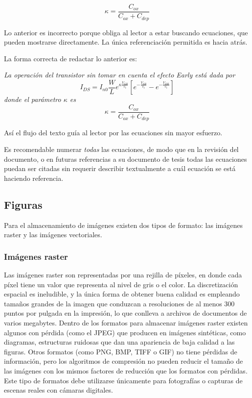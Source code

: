 \begin{equation} \label{eq:ej2}
  \kappa = \frac{C_{ox}}{C_{ox}+C_{dep}}
\end{equation}

Lo anterior es incorrecto porque obliga al lector a estar buscando ecuaciones,
que pueden mostrarse directamente.  La única referenciación permitida es hacia
atrás.

La forma correcta de redactar lo anterior es: 

\textsl{La operación del transistor sin tomar en cuenta el efecto Early está
  dada por}
\begin{equation} \label{eq:ej3}
  I_{DS}
  =
  I_{n0} \frac{W}{L}e^{\kappa \frac{V_{GB}}{v_t}}
  \left[
    e^{-\frac{V_{SB}}{v_t}}
    -
    e^{-\frac{V_{DB}}{v_t}}
  \right]
\end{equation}
\textsl{donde el parámetro $\kappa$ es}
\begin{equation} \label{eq:ej4}
  \kappa = \frac{C_{ox}}{C_{ox}+C_{dep}}
\end{equation}

Así el flujo del texto guía al lector por las ecuaciones sin mayor esfuerzo.

Es recomendable numerar \emph{todas} las ecuaciones, de modo que en la revisión
del documento, o en futuras referencias a su documento de tesis todas las
ecuaciones puedan ser citadas sin requerir describir textualmente a cuál
ecuación se está haciendo referencia.

\subsection{Figuras}

Para el almacenamiento de imágenes existen dos tipos de formato: las imágenes
raster y las imágenes vectoriales.

\subsubsection{Imágenes raster}

Las imágenes raster son representadas por una rejilla de píxeles, en donde cada
píxel tiene un valor que representa al nivel de gris o el color. La
discretización espacial es ineludible, y la única forma de obtener buena
calidad es empleando tamaños grandes de la imagen que conduzcan a resoluciones
de al menos 300 puntos por pulgada en la impresión, lo que conlleva a archivos
de documentos de varios megabytes. Dentro de los formatos para almacenar
imágenes raster existen algunos con pérdida (como el JPEG) que producen en
imágenes sintéticas, como diagramas, estructuras ruidosas que dan una
apariencia de baja calidad a las figuras. Otros formatos (como PNG, BMP, TIFF o
GIF) no tiene pérdidas de información, pero los algoritmos de compresión no
pueden reducir el tamaño de las imágenes con los mismos factores de reducción
que los formatos con pérdidas. Este tipo de formatos debe utilizarse únicamente
para fotografías o capturas de escenas reales con cámaras digitales.

